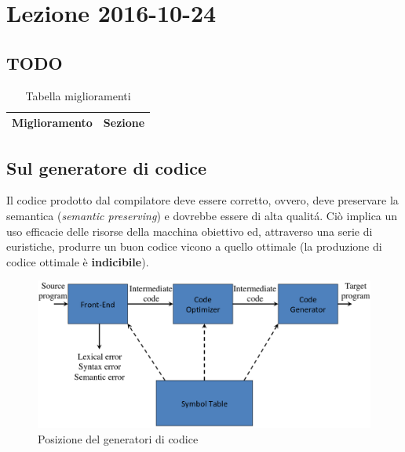 \section{Lezione 2016-10-24}
\subsection{TODO}
\begin{table}[H]
\begin{center}
\begin{tabular}{|p{\textwidth}|c|}
\hline
\multicolumn{1}{|c|}{\textbf{Miglioramento}} & \textbf{Sezione} \\ \hline
\end{tabular}
\end{center}
\caption{Tabella miglioramenti}
\label{tab:tab_todo}
\end{table}

\subsection{Sul generatore di codice}
Il codice prodotto dal compilatore deve essere corretto, ovvero, deve
preservare la semantica (\textit{semantic preserving}) e dovrebbe essere di
alta qualit\'a. Ci\`o implica un uso efficacie delle risorse della macchina
obiettivo ed, attraverso una serie di euristiche, produrre un buon codice
vicono a quello ottimale (la produzione di codice ottimale \`e
\textbf{indicibile}).

\begin{figure}[H]
  \centering
  \includegraphics[scale=0.4]{res/image/code_generator_position}
  \caption{Posizione del generatori di codice}
  \label{img:code_generator_position}
\end{figure}

